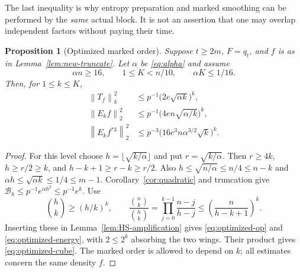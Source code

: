\documentclass[11pt]{article}
\numberwithin{equation}{section}
\newtheorem{proposition}[theorem]{Proposition}
\theoremstyle{definition}\newtheorem{definition}[theorem]{Definition}
\theoremstyle{remark}\newtheorem{remark}[theorem]{Remark}
\newcommand{\norm}[1]{\left\lVert#1\right\rVert}
\begin{document}
The last inequality is why entropy preparation and marked smoothing can
be performed by the \emph{same} actual block. It is not an assertion that
one may overlap independent factors without paying their time.

\begin{proposition}[Optimized marked order]\label{prop:optimized-order}
Suppose $t\ge2m$, $F=q_t$, and $f$ is as in
Lemma~\ref{lem:new-truncate}. Let $\alpha$ be \eqref{eq:alpha} and assume
\begin{equation}\label{eq:order-domain}
 \alpha n\ge16,\qquad 1\le K<n/10,\qquad \alpha K\le1/16.
\end{equation}
Then, for $1\le k\le K$,
\begin{align}
 \norm{T_f}_k^2
 &\le p^{-1}\bigl(2e\sqrt{\alpha k}\bigr)^k,
 \label{eq:optimized-op}\\
 \norm{E_k f}_2^2
 &\le p^{-1}\bigl(4en\sqrt{\alpha/k}\bigr)^k,
 \label{eq:optimized-energy}\\
 \norm{E_k f^{*3}}_2^2
 &\le p^{-3}\bigl(16e^3n\alpha^{3/2}\sqrt{k}\bigr)^k.
 \label{eq:optimized-cube}
\end{align}
\end{proposition}
\begin{proof}
For this level choose $h=\lfloor\sqrt{k/\alpha}\rfloor$ and put
$r=\sqrt{k/\alpha}$. Then $r\ge4k$,
$h\ge r/2\ge k$, and $h-k+1\ge r-k\ge r/2$.
Also $h\le\sqrt{n/\alpha}\le n/4\le n-k$ and
$\alpha h\le\sqrt{\alpha k}\le1/4\le m-1$. Corollary~\ref{cor:quadratic}
and truncation give $\mathcal B_h\le p^{-1}e^{\alpha h^2}\le p^{-1}e^k$.
Use
\[
 \binom hk\ge(h/k)^k,\qquad
 \frac{\binom nk}{\binom hk}
 =\prod_{j=0}^{k-1}\frac{n-j}{h-j}
 \le\left(\frac n{h-k+1}\right)^k.
\]
Inserting these in Lemma~\ref{lem:HS-amplification} gives
\eqref{eq:optimized-op} and \eqref{eq:optimized-energy}, with
$2\le2^k$ absorbing the two wings. Their product gives
\eqref{eq:optimized-cube}. The marked order is allowed to depend on $k$;
all estimates concern the same density $f$.
\end{proof}
\end{document}
